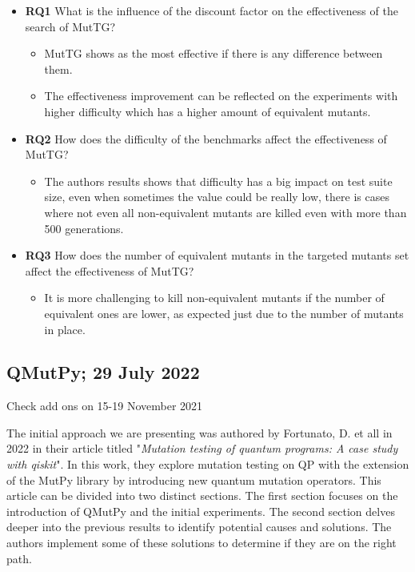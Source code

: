 \begin{itemize}
\begin{itemize}
    \item[] \textbf{RQ1} What is the influence of the discount factor on the effectiveness of the search of MutTG?
        \begin{itemize}
            \item MutTG shows as the most effective if there is any difference between them.
            \item The effectiveness improvement can be reflected on the experiments with higher difficulty which has a higher amount of equivalent mutants.
        \end{itemize}
    \item[] \textbf{RQ2} How does the difficulty of the benchmarks affect the effectiveness of MutTG?
        \begin{itemize}
            \item The authors results shows that difficulty has a big impact on test suite size, even when sometimes the value could be really low, there is cases where not even all non-equivalent mutants are killed even with more than 500 generations. 
        \end{itemize}
    \item[] \textbf{RQ3} How does the number of equivalent mutants in the targeted mutants set affect the effectiveness of MutTG?
        \begin{itemize}
            \item It is more challenging to kill non-equivalent mutants if the number of equivalent ones are lower, as expected just due to the number of mutants in place.
        \end{itemize}
\end{itemize}

\vspace{15pt}
\subsection{QMutPy; 29 July 2022}
\label{Ch3.2.4:QMutPy}

Check add ons on 15-19 November 2021 \cite{fortunato2022qmutpy}

The initial approach we are presenting was authored by Fortunato, D. et all in 2022 in their article titled "\textit{Mutation testing of quantum programs: A case study with qiskit}"\cite{fortunato2022mutation}. In this work, they explore mutation testing on QP with the extension of the MutPy library by introducing new quantum mutation operators. This article can be divided into two distinct sections. The first section focuses on the introduction of QMutPy and the initial experiments. The second section delves deeper into the previous results to identify potential causes and solutions. The authors implement some of these solutions to determine if they are on the right path. \newline


\end{itemize}
